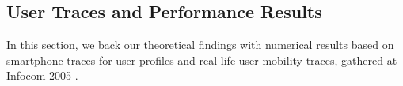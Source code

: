 \documentclass[conference]{IEEEtran}
\theoremstyle{definition}
\begin{document}
\vspace{-0.5 cm}
\subsection{User Traces and Performance Results}
\vspace{-0.2 cm}
In this section, we back our theoretical findings with numerical results based on 
smartphone traces for user profiles \cite{data} and real-life user mobility traces, gathered at Infocom 2005 \cite{infocom,diot}.
\vspace{-0.3 cm}
\end{document}
